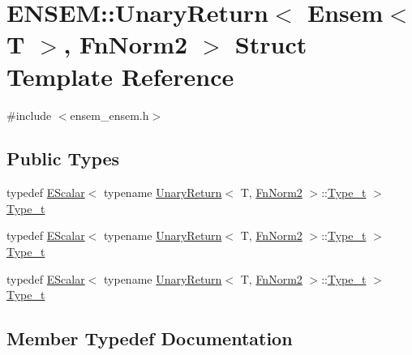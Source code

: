 \hypertarget{structENSEM_1_1UnaryReturn_3_01Ensem_3_01T_01_4_00_01FnNorm2_01_4}{}\section{E\+N\+S\+EM\+:\+:Unary\+Return$<$ Ensem$<$ T $>$, Fn\+Norm2 $>$ Struct Template Reference}
\label{structENSEM_1_1UnaryReturn_3_01Ensem_3_01T_01_4_00_01FnNorm2_01_4}


{\ttfamily \#include $<$ensem\+\_\+ensem.\+h$>$}

\subsection*{Public Types}
\begin{DoxyCompactItemize}
\item 
typedef \mbox{\hyperlink{classENSEM_1_1EScalar}{E\+Scalar}}$<$ typename \mbox{\hyperlink{structENSEM_1_1UnaryReturn}{Unary\+Return}}$<$ T, \mbox{\hyperlink{structENSEM_1_1FnNorm2}{Fn\+Norm2}} $>$\+::\mbox{\hyperlink{structENSEM_1_1UnaryReturn_3_01Ensem_3_01T_01_4_00_01FnNorm2_01_4_ab4124c6816741e910b729ef32c1a9c37}{Type\+\_\+t}} $>$ \mbox{\hyperlink{structENSEM_1_1UnaryReturn_3_01Ensem_3_01T_01_4_00_01FnNorm2_01_4_ab4124c6816741e910b729ef32c1a9c37}{Type\+\_\+t}}
\item 
typedef \mbox{\hyperlink{classENSEM_1_1EScalar}{E\+Scalar}}$<$ typename \mbox{\hyperlink{structENSEM_1_1UnaryReturn}{Unary\+Return}}$<$ T, \mbox{\hyperlink{structENSEM_1_1FnNorm2}{Fn\+Norm2}} $>$\+::\mbox{\hyperlink{structENSEM_1_1UnaryReturn_3_01Ensem_3_01T_01_4_00_01FnNorm2_01_4_ab4124c6816741e910b729ef32c1a9c37}{Type\+\_\+t}} $>$ \mbox{\hyperlink{structENSEM_1_1UnaryReturn_3_01Ensem_3_01T_01_4_00_01FnNorm2_01_4_ab4124c6816741e910b729ef32c1a9c37}{Type\+\_\+t}}
\item 
typedef \mbox{\hyperlink{classENSEM_1_1EScalar}{E\+Scalar}}$<$ typename \mbox{\hyperlink{structENSEM_1_1UnaryReturn}{Unary\+Return}}$<$ T, \mbox{\hyperlink{structENSEM_1_1FnNorm2}{Fn\+Norm2}} $>$\+::\mbox{\hyperlink{structENSEM_1_1UnaryReturn_3_01Ensem_3_01T_01_4_00_01FnNorm2_01_4_ab4124c6816741e910b729ef32c1a9c37}{Type\+\_\+t}} $>$ \mbox{\hyperlink{structENSEM_1_1UnaryReturn_3_01Ensem_3_01T_01_4_00_01FnNorm2_01_4_ab4124c6816741e910b729ef32c1a9c37}{Type\+\_\+t}}
\end{DoxyCompactItemize}


\subsection{Member Typedef Documentation}
\mbox{\label{structENSEM_1_1UnaryReturn_3_01Ensem_3_01T_01_4_00_01FnNorm2_01_4_ab4124c6816741e910b729ef32c1a9c37}} 
